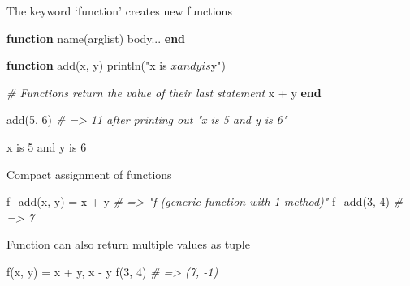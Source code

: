 \documentclass[ignorenonframetext,]{beamer}
\newenvironment{Shaded}{}{}
\newcommand{\KeywordTok}[1]{\textcolor[rgb]{0.00,0.44,0.13}{\textbf{{#1}}}}
\newcommand{\FloatTok}[1]{\textcolor[rgb]{0.25,0.63,0.44}{{#1}}}
\newcommand{\StringTok}[1]{\textcolor[rgb]{0.25,0.44,0.63}{{#1}}}
\newcommand{\CommentTok}[1]{\textcolor[rgb]{0.38,0.63,0.69}{\textit{{#1}}}}
\newcommand{\NormalTok}[1]{{#1}}
\begin{document}
\begin{frame}[fragile]{The keyword `function' creates new functions}

\begin{Shaded}
\begin{Highlighting}[]
\KeywordTok{function} \NormalTok{name(arglist)}
  \NormalTok{body...}
\KeywordTok{end}

\KeywordTok{function} \NormalTok{add(x, y)}
    \NormalTok{println(}\StringTok{"x is $x and y is $y"}\NormalTok{)}

    \CommentTok{# Functions return the value of their last statement}
    \NormalTok{x + y}
\KeywordTok{end}

\NormalTok{add(}\FloatTok{5}\NormalTok{, }\FloatTok{6}\NormalTok{) }\CommentTok{# => 11 after printing out "x is 5 and y is 6"}
\end{Highlighting}
\end{Shaded}

\begin{Shaded}
\begin{Highlighting}[]
\NormalTok{x is }\FloatTok{5} \NormalTok{and y is }\FloatTok{6}
\end{Highlighting}
\end{Shaded}

\end{frame}

\begin{frame}[fragile]{Compact assignment of functions}

\begin{Shaded}
\begin{Highlighting}[]
\NormalTok{f_add(x, y) = x + y }\CommentTok{# => "f (generic function with 1 method)"}
\NormalTok{f_add(}\FloatTok{3}\NormalTok{, }\FloatTok{4}\NormalTok{) }\CommentTok{# => 7}
\end{Highlighting}
\end{Shaded}

\end{frame}

\begin{frame}[fragile]{Function can also return multiple values as
tuple}

\begin{Shaded}
\begin{Highlighting}[]
\NormalTok{f(x, y) = x + y, x - y}
\NormalTok{f(}\FloatTok{3}\NormalTok{, }\FloatTok{4}\NormalTok{) }\CommentTok{# => (7, -1)}
\end{Highlighting}
\end{Shaded}

\end{frame}
\end{document}
